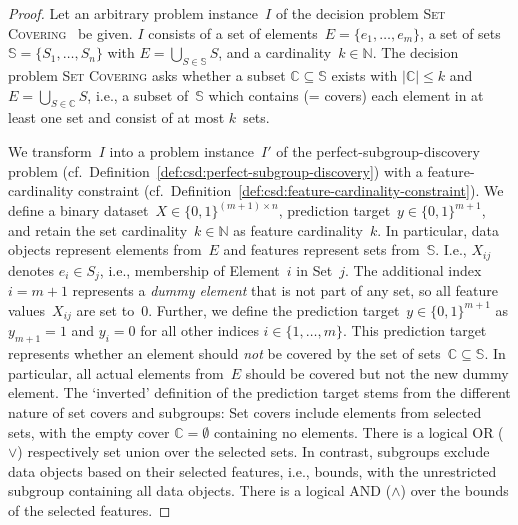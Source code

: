 \documentclass{article}
\theoremstyle{definition}
\begin{document}
\begin{proof}
Let an arbitrary problem instance~$I$ of the decision problem \textsc{Set Covering}~\cite{karp1972reducibility} be given.
$I$ consists of a set of elements~$E = \{e_1, \dots, e_m\}$, a set of sets~$\mathbb{S} = \{S_1,  \dots, S_n\}$ with $E = \bigcup_{S \in \mathbb{S}} S$, and a cardinality~$k \in \mathbb{N}$.
The  decision problem \textsc{Set Covering} asks whether a subset $\mathbb{C} \subseteq \mathbb{S}$ exists with $|\mathbb{C}| \leq k$ and $E = \bigcup_{S \in \mathbb{C}} S$, i.e., a subset of~$\mathbb{S}$ which contains (= covers) each element in at least one set and consist of at most $k$~sets.

We transform~$I$ into a problem instance~$I'$ of the perfect-subgroup-discovery problem (cf.~Definition~\ref{def:csd:perfect-subgroup-discovery}) with a feature-cardinality constraint (cf.~Definition~\ref{def:csd:feature-cardinality-constraint}).
We define a binary dataset~$X \in \{0, 1\}^{(m + 1) \times n}$, prediction target~$y \in \{0, 1\}^{m+1}$, and retain the set cardinality~$k \in \mathbb{N}$ as feature cardinality~$k$.
In particular, data objects represent elements from~$E$ and features represent sets from~$\mathbb{S}$.
I.e., $X_{ij}$ denotes $e_i \in S_j$, i.e., membership of Element~$i$ in Set~$j$.
The additional index $i = m + 1$ represents a \emph{dummy element} that is not part of any set, so all feature values~$X_{ij}$ are set to~0.
Further, we define the prediction target~$y \in \{0, 1\}^{m+1}$ as $y_{m+1} = 1$ and $y_i = 0$ for all other indices $i \in \{1, \dots, m\}$.
This prediction target represents whether an element should \emph{not} be covered by the set of sets~$\mathbb{C} \subseteq \mathbb{S}$.
In particular, all actual elements from~$E$ should be covered but not the new dummy element.
The `inverted' definition of the prediction target stems from the different nature of set covers and subgroups:
Set covers include elements from selected sets, with the empty cover $\mathbb{C} = \emptyset$ containing no elements.
There is a logical OR ($\lor$) respectively set union over the selected sets.
In contrast, subgroups exclude data objects based on their selected features, i.e., bounds, with the unrestricted subgroup containing all data objects.
There is a logical AND ($\land$) over the bounds of the selected features.


\end{proof}
\end{document}
